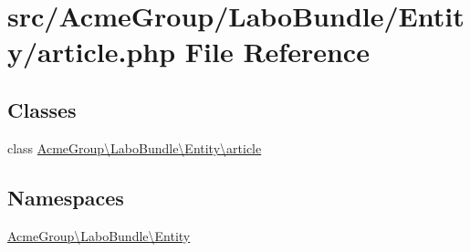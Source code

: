 \hypertarget{_labo_bundle_2_entity_2article_8php}{\section{src/\+Acme\+Group/\+Labo\+Bundle/\+Entity/article.php File Reference}
\label{_labo_bundle_2_entity_2article_8php}
}
\subsection*{Classes}
\begin{DoxyCompactItemize}
\item 
class \hyperlink{class_acme_group_1_1_labo_bundle_1_1_entity_1_1article}{Acme\+Group\textbackslash{}\+Labo\+Bundle\textbackslash{}\+Entity\textbackslash{}article}
\end{DoxyCompactItemize}
\subsection*{Namespaces}
\begin{DoxyCompactItemize}
\item 
 \hyperlink{namespace_acme_group_1_1_labo_bundle_1_1_entity}{Acme\+Group\textbackslash{}\+Labo\+Bundle\textbackslash{}\+Entity}
\end{DoxyCompactItemize}
